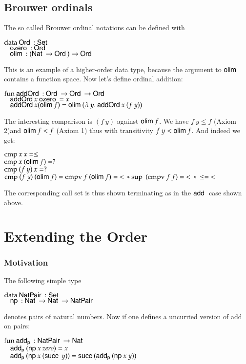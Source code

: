 \subsection{Brouwer ordinals}
The so called Brouwer ordinal notations can be defined with
\begin{bsp}
$\mathrm{data}\: \mathsf{Ord}\: : \mathsf{Set}$ \\
$\hspace*{3mm} \mathsf{ozero}\: : \mathsf{Ord}\: $\\
$\hspace*{3mm} \mathsf{olim}\: : (\mathsf{Nat}\: \rightarrow \mathsf{Ord}\: ) \rightarrow \mathsf{Ord}\: $
\end{bsp}
This is an example of a higher-order data type, because the argument to $\mathsf{olim}\:$ contains a function space.
Now let's define ordinal addition:
\begin{bsp}
$\mathrm{fun}\: \mathsf{addOrd}\: : \mathsf{Ord}\: \rightarrow \mathsf{Ord}\: \rightarrow \mathsf{Ord}\:$\\
$\hspace*{3mm} \mathsf{addOrd}\: x \: \mathsf{ozero}\: = x $\\
$\hspace*{3mm} \mathsf{addOrd}\: x (\mathsf{olim}\: f) = \mathsf{olim}\: ( \lambda\: y .\: \mathsf{addOrd}\:  x \: (f \: y))  $
\end{bsp}
The interesting comparison is $(f \: y)$ against $\mathsf{olim}\: f$.
We have  $f \: y \leq f$ (Axiom 2)and $\mathsf{olim}\: f < f $ (Axiom 1) thus with transitivity $ f\: y < \mathsf{olim}\: f$.
And indeed we get:
\begin{bsp}
$\mathrm{cmp} \: x \: x = \leq $\\
$\mathrm{cmp} \: x \: (\mathsf{olim}\: f) = ? $\\
$\mathrm{cmp} \: (f \: y) \: x = ? $\\
$\mathrm{cmp} \: (f \: y) \: (\mathsf{olim}\: f) = \mathrm{cmpv} \: f \: (\mathsf{olim}\: f) = \: < \: * \: \mathrm{sup}\: \: (\mathrm{cmpv} \: f \: f) = \: < \: * \: \leq = \: < $ 
\end{bsp}
The corresponding call set is thus shown terminating as in the $\mathsf{add}\:$ case shown above.
\section{Extending the Order}

\subsubsection{Motivation}

The following simple type
\begin{bsp}
$\mathrm{data}\: \mathsf{NatPair}\: : \mathsf{Set}$\\
$\hspace*{3mm} \mathsf{np}\: : \mathsf{Nat}\: \rightarrow \mathsf{Nat}\: \rightarrow \mathsf{NatPair}\: $
\end{bsp}
denotes pairs of natural numbers. Now if one defines a uncurried version of add on pairs:
\begin{bsp}
$\mathrm{fun}\: \mathsf{add_p}\: : \mathsf{NatPair}\: \rightarrow \mathsf{Nat}\:$\\
$\hspace*{3mm} \mathsf{add_p}\: (\mathsf{np}\: x \: zero) = x$\\
$\hspace*{3mm} \mathsf{add_p}\: (\mathsf{np}\: x \: (\mathsf{succ}\: \: y)) = \mathsf{succ}\: (\mathsf{add_p}\: (\mathsf{np}\: x \: y))$
\end{bsp}

